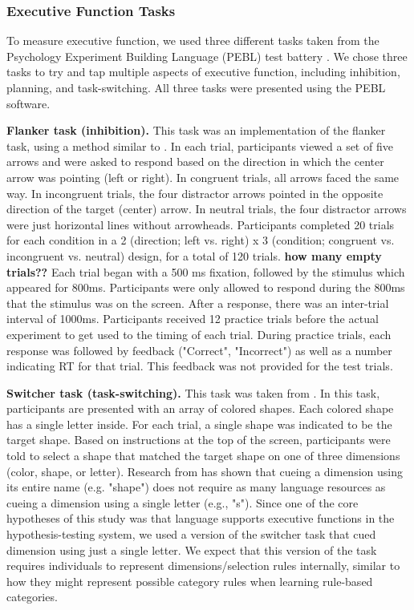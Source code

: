 \documentclass[../dissertation.tex]{subfiles}
\begin{document}
\subsubsection{Executive Function Tasks} 
To measure executive function, we used three different tasks taken from the Psychology Experiment Building Language (PEBL) test battery \citep{Mueller2014}. We chose three tasks to try and tap multiple aspects of executive function, including inhibition, planning, and task-switching. All three tasks were presented using the PEBL software.\par
\textbf{Flanker task (inhibition).} This task was an implementation of the \citet{Eriksen1979} flanker task, using a method similar to \citet{Stins2007}. In each trial, participants viewed a set of five arrows and were asked to respond based on the direction in which the center arrow was pointing (left or right). In congruent trials, all arrows faced the same way. In incongruent trials, the four distractor arrows pointed in the opposite direction of the target (center) arrow. In neutral trials, the four distractor arrows were just horizontal lines without arrowheads. Participants completed 20 trials for each condition in a 2 (direction; left vs. right) x 3 (condition; congruent vs. incongruent vs. neutral) design, for a total of 120 trials. \textbf{how many empty trials??} Each trial began with a 500 ms fixation, followed by the stimulus which appeared for 800ms. Participants were only allowed to respond during the 800ms that the stimulus was on the screen. After a response, there was an inter-trial interval of 1000ms. Participants received 12 practice trials before the actual experiment to get used to the timing of each trial. During practice trials, each response was followed by feedback ("Correct", "Incorrect") as well as a number indicating RT for that trial. This feedback was not provided for the test trials. \par
\textbf{Switcher task (task-switching).} This task was taken from \citet{Anderson2012}. In this task, participants are presented with an array of colored shapes. Each colored shape has a single letter inside. For each trial, a single shape was indicated to be the target shape. Based on instructions at the top of the screen, participants were told to select a shape that matched the target shape on one of three dimensions (color, shape, or letter). Research from \citet{Miyake2004} has shown that cueing a dimension using its entire name (e.g. "shape") does not require as many language resources as cueing a dimension using a single letter (e.g., "s"). Since one of the core hypotheses of this study was that language supports executive functions in the hypothesis-testing system, we used a version of the switcher task that cued dimension using just a single letter. We expect that this version of the task requires individuals to represent dimensions/selection rules internally, similar to how they might represent possible category rules when learning rule-based categories. \par
\end{document}
